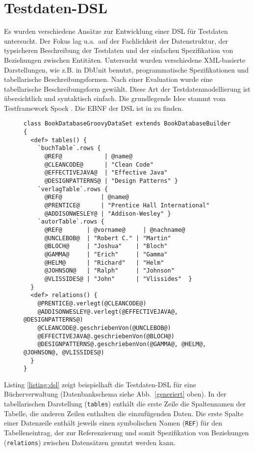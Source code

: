 \section{Testdaten-DSL}


Es wurden verschiedene Ansätze zur Entwicklung einer DSL für Testdaten untersucht. Der Fokus lag u.a.~auf der Fachlichkeit der Datenstruktur, der typsicheren Beschreibung der Testdaten und der einfachen Spezifikation von Beziehungen zwischen Entitäten. Untersucht wurden verschiedene XML-basierte Darstellungen, wie z.B. in DbUnit benutzt, programmatische Spezifikationen und  tabellarische Beschreibungsformen. 
%
Nach einer Evaluation wurde eine tabellarische Beschreibungsform gewählt.
%
%
Diese Art der Testdatenmodellierung ist übersichtlich und  syntaktisch einfach. Die grundlegende Idee 
%
%
stammt vom Testframework Spock \cite{Spock}.
%
Die EBNF der DSL ist in \cite{MT:Moll:2013} zu finden.



\begin{figure}[tb]
\begin{lstlisting}[caption=Beispiel eines mittels DSL beschriebenen Testdaten-Sets., style=java, label=listing:dsl]
class BookDatabaseGroovyDataSet extends BookDatabaseBuilder {
  <def> tables() {
    `buchTable`.rows {
      @REF@            | @name@
      @CLEANCODE@      | "Clean Code"      
      @EFFECTIVEJAVA@  | "Effective Java"  
      @DESIGNPATTERNS@ | "Design Patterns" }
    `verlagTable`.rows {
      @REF@           | @name@
      @PRENTICE@      | "Prentice Hall International"
      @ADDISONWESLEY@ | "Addison-Wesley" }
    `autorTable`.rows {
      @REF@       | @vorname@     | @nachname@
      @UNCLEBOB@  | "Robert C." | "Martin"
      @BLOCH@     | "Joshua"    | "Bloch"
      @GAMMA@     | "Erich"     | "Gamma"
      @HELM@      | "Richard"   | "Helm"
      @JOHNSON@   | "Ralph"     | "Johnson"
      @VLISSIDES@ | "John"      | "Vlissides"  }
  }
  <def> relations() {
    @PRENTICE@.verlegt(@CLEANCODE@)
    @ADDISONWESLEY@.verlegt(@EFFECTIVEJAVA@, @DESIGNPATTERNS@)
    @CLEANCODE@.geschriebenVon(@UNCLEBOB@)
    @EFFECTIVEJAVA@.geschriebenVon(@BLOCH@)
    @DESIGNPATTERNS@.geschriebenVon(@GAMMA@, @HELM@, @JOHNSON@, @VLISSIDES@) 
  }
}
\end{lstlisting}
\end{figure}


Listing \ref{listing:dsl} zeigt beispielhaft die Testdaten-DSL für eine Bücherverwaltung (Datenbankschema siehe Abb.~\ref{generiert} oben). In der tabellarischen Darstellung (\texttt{tables}) enthält die erste Zeile die Spaltennamen der Tabelle, die anderen Zeilen enthalten die einzufügenden Daten. Die erste Spalte einer Datenzeile enthält jeweils einen symbolischen Namen (\texttt{REF}) für den Tabelleneintrag, der zur Referenzierung und somit Spezifikation von Beziehungen (\texttt{relations}) zwischen Datensätzen genutzt werden kann.

